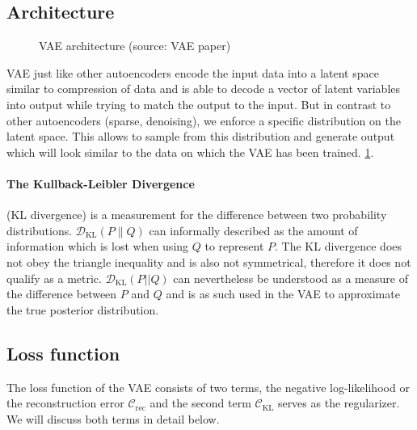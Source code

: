 
\subsection{Architecture}
\label{sub:vae_architecture}

\begin{figure}[htb]
\centering
\resizebox{5cm}{!}{}
  \caption{VAE architecture (source: VAE paper)}\label{fig:vae_architecture}
\end{figure}
VAE just like other autoencoders encode the input data into a latent space similar to compression of data and is able to decode a vector of latent variables into output while trying to match the output to the input.
But in contrast to other autoencoders (sparse, denoising), we enforce a specific distribution on the latent space.
This allows to sample from this distribution and generate output which will look similar to the data on which the VAE has been trained.
\ref{fig:vae_architecture}.

\paragraph{The Kullback-Leibler Divergence} (KL divergence) is a measurement for the difference between two probability distributions. $\mathcal{D}_{\mathrm{KL}}(P \| Q)$ can informally described as the amount of information which is lost when using $Q$ to represent $P$.
The KL divergence does not obey the triangle inequality and is also not symmetrical, therefore it does not qualify as a metric.
$\mathcal{D}_{\mathrm{KL}}(P||Q)$ can nevertheless be understood as a measure of the difference between $P$ and $Q$ and is as such used in the VAE to approximate the true posterior distribution.

\subsection{Loss function}
The loss function of the VAE consists of two terms, the negative log-likelihood or the reconstruction error $\mathcal{C}_{\mathrm{rec}}$ and the second term $\mathcal{C}_{\mathrm{KL}}$ serves as the regularizer.
We will discuss both terms in detail below.

